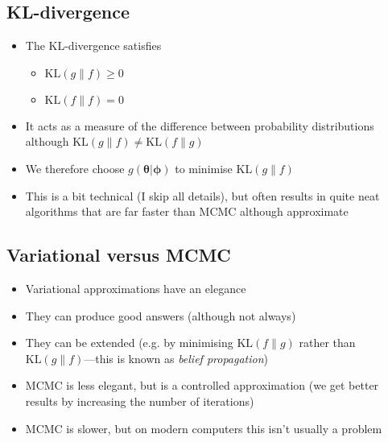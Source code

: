 \begin{slide}
\section{KL-divergence}

\begin{PauseHighLight}
  \begin{itemize}
  \item The KL-divergence satisfies
    \begin{itemize}
    \item $\mathrm{KL}(g \| f) \geq 0$
    \item $\mathrm{KL}(f \| f) = 0$\pause
    \end{itemize}
  \item It acts as a measure of the difference between probability
    distributions although $\mathrm{KL}(g \| f) \neq \mathrm{KL}(f \|
    g)$\pause
  \item We therefore choose $g(\bm{\theta}|\bm{\phi})$ to minimise
    $\mathrm{KL}(g \| f)$\pause
  \item This is a bit technical (I skip all details), but often results
    in quite neat algorithms that are far faster than MCMC although
    approximate\pause
  \end{itemize}
\end{PauseHighLight}

\end{slide}


\begin{slide}
\section{Variational versus MCMC}

\begin{PauseHighLight}
  \begin{itemize}
  \item Variational approximations have an elegance\pause
  \item They can produce good answers (although not always)\pause
  \item They can be extended (e.g. by minimising $\mathrm{KL}(f \| g)$
    rather than $\mathrm{KL}(g \| f)$---this is known as\textit{ belief
      propagation})\pause
  \item MCMC is less elegant, but is a controlled approximation (we get
    better results by increasing the number of iterations)\pause
  \item MCMC is slower, but on modern computers this isn't usually a
    problem\pause
  \end{itemize}
\end{PauseHighLight}

\end{slide}

